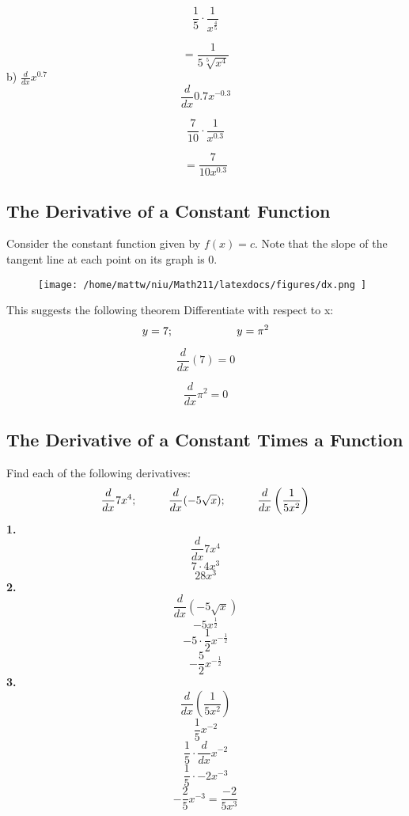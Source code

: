 \documentclass{report}
\begin{document}
$$\frac{1}{5} \cdot \frac{1}{x^{\frac{4}{5}}}$$

$$= \frac{1}{5\sqrt[5]{x^4}}$$
\bigbreak \noindent
b) $\frac{d}{dx}x^{0.7}$
  $$ \frac{d}{dx}0.7x^{-0.3}$$

  $$\frac{7}{10}\cdot\frac{1}{x^{0.3}}$$

  $$ = \frac{7}{10x^{0.3}}$$
  \bigbreak \noindent
  \subsection*{The Derivative of a Constant Function}
  Consider the constant function given by $f(x) = c$. Note that the slope of the tangent line at each point on its graph is 0.
\begin{figure}[ht]
\centering
\texttt{[image:  /home/mattw/niu/Math211/latexdocs/figures/dx.png ]}
\end{figure}

\pagebreak
\noindent This suggests the following theorem
\bigbreak \noindent
{}
\bigbreak \noindent
Differentiate with respect to x:
$$y=7; \hspace{20mm} y = \pi^2$$
\sol
\bigbreak \noindent
\begin{minipage}{0.5\textwidth}
$$ \frac{d}{dx}(7) = 0$$
\end{minipage}
\begin{minipage}{0.45\textwidth}
$$ \frac{d}{dx}\pi^2 = 0$$	
\end{minipage}
\bigbreak \noindent
\subsection*{The Derivative of a Constant Times a Function}
\bigbreak \noindent
Find each of the following derivatives:
$$ \frac{d}{dx}7x^4; \hspace{10mm} \frac{d}{dx}(-5\sqrt{x}); \hspace{10mm} \frac{d}{dx}\left(\frac{1}{5x^2}\right)$$
\bigbreak \noindent \bigbreak \noindent
\textbf{1.} 
$$ \frac{d}{dx}7x^4$$
$$ 7 \cdot 4x^3$$
$$ 28x^3$$
\bigbreak \noindent
\textbf{2.}
$$ \frac{d}{dx}(-5\sqrt{x})$$
$$ -5x^{\frac{1}{2}}$$
$$ -5 \cdot \frac{1}{2}x^{-\frac{1}{2}}$$
$$-\frac{5}{2}x^{-\frac{1}{2}}$$
\bigbreak \noindent
\textbf{3.}
$$ \frac{d}{dx}\left(\frac{1}{5x^2}\right)$$         
$$ \frac{1}{5}x^{-2}$$
$$ \frac{1}{5}\cdot \frac{d}{dx}x^{-2}$$
$$ \frac{1}{5} \cdot -2x^{-3}$$
$$ -\frac{2}{5}x^{-3} = \frac{-2}{5x^3}$$
\pagebreak
\end{document}
